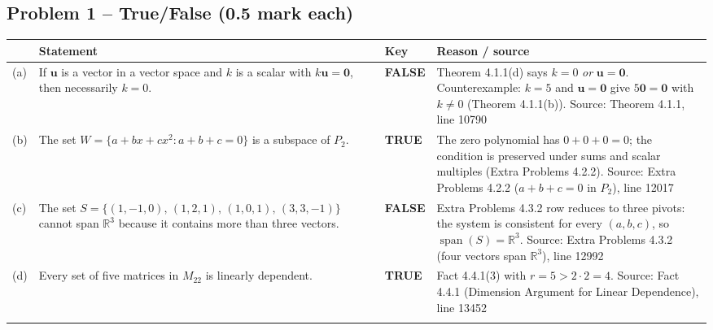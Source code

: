 \documentclass[11pt,a4paper]{article}
\newcommand{\Src}[1]{{\footnotesize\color{black!65}Source: #1}}
\begin{document}
\subsection*{Problem 1 -- True/False (0.5 mark each)}
\begin{tabularx}{\linewidth}{@{}l X l X@{}}\toprule & Statement & Key & Reason / source\\\midrule
(a) & If $\mathbf{u}$ is a vector in a vector space and $k$ is a scalar with $k\mathbf{u}=\mathbf{0}$, then necessarily $k=0$. & \textbf{FALSE} & Theorem 4.1.1(d) says $k=0$ \emph{or} $\mathbf{u}=\mathbf{0}$. Counterexample: $k=5$ and $\mathbf{u}=\mathbf{0}$ give $5\mathbf{0}=\mathbf{0}$ with $k\neq0$ (Theorem 4.1.1(b)). \Src{Theorem 4.1.1, line 10790}\\\addlinespace
(b) & The set $W=\{a+bx+cx^2 : a+b+c=0\}$ is a subspace of $P_2$. & \textbf{TRUE} & The zero polynomial has $0+0+0=0$; the condition is preserved under sums and scalar multiples (Extra Problems 4.2.2). \Src{Extra Problems 4.2.2 ($a+b+c=0$ in $P_2$), line 12017}\\\addlinespace
(c) & The set $S=\{(1,-1,0),\,(1,2,1),\,(1,0,1),\,(3,3,-1)\}$ cannot span $\mathbb{R}^3$ because it contains more than three vectors. & \textbf{FALSE} & Extra Problems 4.3.2 row reduces to three pivots: the system is consistent for every $(a,b,c)$, so $\operatorname{span}(S)=\mathbb{R}^3$. \Src{Extra Problems 4.3.2 (four vectors span $\mathbb{R}^3$), line 12992}\\\addlinespace
(d) & Every set of five matrices in $M_{22}$ is linearly dependent. & \textbf{TRUE} & Fact 4.4.1(3) with $r=5>2\cdot2=4$. \Src{Fact 4.4.1 (Dimension Argument for Linear Dependence), line 13452}\\\addlinespace
\bottomrule\end{tabularx}
\end{document}
